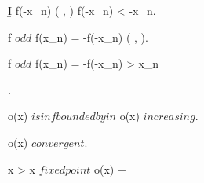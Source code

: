 \documentclass[../Main/main]{subfiles}
\begin{document}
{{{{{					\b{I} \imp f(-x_n) \in ( , \infty) \logicAnd f(-x_n) < -x_n.

					f $ odd $ \imp f(x_n) = -f(-x_n) \in ( , \infty).

					f $ odd $ \imp f(x_n) = -f(-x_n) > x_n
				}.

				\conclude o(x) $ is inf bounded by in $  \logicAnd o(x) $ increasing $.

				o(x) $ convergent $.

				\nexists \;  x >  \suchthat x $ fixed point $ \imp o(x) \convergesto +\infty

			}	

		}
	}
}
\end{document}
